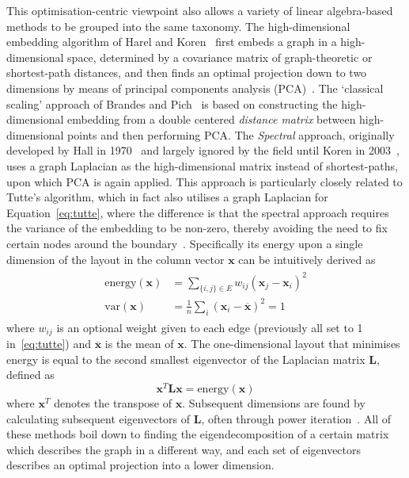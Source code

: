 This optimisation-centric viewpoint also allows a variety of linear algebra-based methods to be grouped into the same taxonomy.
The high-dimensional embedding algorithm of Harel and Koren~\cite{hde} first embeds a graph in a high-dimensional space, determined by a covariance matrix of graph-theoretic or shortest-path distances, and then finds an optimal projection down to two dimensions by means of principal components analysis (PCA)~\cite{pca}.
The `classical scaling' approach of Brandes and Pich~\cite{brandes_eigensolver} is based on constructing the high-dimensional embedding from a double centered \emph{distance matrix} between high-dimensional points and then performing PCA.
The \emph{Spectral} approach, originally developed by Hall in 1970~\cite{hall} and largely ignored by the field until Koren in 2003~\cite{koren_spectral}, uses a graph Laplacian as the high-dimensional matrix instead of shortest-paths, upon which PCA is again applied. This approach is particularly closely related to Tutte's algorithm, which in fact also utilises a graph Laplacian for Equation~\eqref{eq:tutte}, where the difference is that the spectral approach requires the variance of the embedding to be non-zero, thereby avoiding the need to fix certain nodes around the boundary~\cite{koren_spectral}.
Specifically its energy upon a single dimension of the layout in the column vector $\mathbf{x}$ can be intuitively derived as
\begin{align}
\begin{split}
    \mathrm{energy}(\mathbf{x}) &= \sum_{\{i,j\}\in E}w_{ij}(\mathbf{x}_j-\mathbf{x}_i)^2\\
    \mathrm{var}(\mathbf{x}) &= \frac{1}{n}\sum_i(\mathbf{x}_i-\overline{\mathbf{x}})^2 = 1
\end{split}
\label{eq:spectral}
\end{align}
where $w_{ij}$ is an optional weight given to each edge (previously all set to 1 in~\eqref{eq:tutte}) and $\overline{\mathbf{x}}$ is the mean of $\mathbf{x}$. The one-dimensional layout that minimises energy is equal to the second smallest eigenvector of the Laplacian matrix $\mathbf{L}$, defined as
\begin{equation}
    \mathbf{x}^T\mathbf{Lx} = \mathrm{energy}(\mathbf{x})
\end{equation}
where $\mathbf{x}^T$ denotes the transpose of $\mathbf{x}$. Subsequent dimensions are found by calculating subsequent eigenvectors of $\mathbf{L}$, often through power iteration~\cite{koren_spectral}.
All of these methods boil down to finding the eigendecomposition of a certain matrix which describes the graph in a different way, and each set of eigenvectors describes an optimal projection into a lower dimension.

